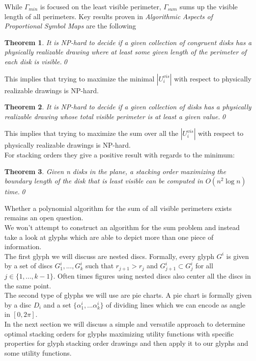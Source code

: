 \documentclass[a4paper,11pt]{article}
\newtheorem{theorem}{Theorem}
\begin{document}
While $\Gamma_{min}$ is focused on the least visible perimeter, $\Gamma_{sum}$ sums up the visible length of all perimeters. Key results proven in \textit{Algorithmic Aspects of Proportional Symbol Maps} are the following
\begin{theorem}
  It is NP-hard to decide if a given collection of congruent disks has a
  physically realizable drawing where at least some given length of the perimeter of
  each disk is visible.\qed
\end{theorem}
This implies that trying to maximize the minimal $|U_i^{vis}|$ with respect to physically realizable drawings is NP-hard.
\begin{theorem}
  It is NP-hard to decide if a given collection of disks has a physically
  realizable drawing whose total visible perimeter is at least a given value.\qed
\end{theorem}
This implies that trying to maximize the sum over all the $|U_i^{vis}|$ with respect to physically realizable drawings is NP-hard.\\
For stacking orders they give a positive result with regards to the minimum:
\begin{theorem}
  Given n disks in the plane, a stacking order maximizing the boundary
  length of the disk that is least visible can be computed in $O(n^2 \log n)$ time.\qed
\end{theorem}
Whether a polynomial algorithm for the sum of all visible perimeters exists remains an open question.\\

We won't attempt to construct an algorithm for the sum problem and instead take a look at glyphs which are able to depict more than one piece of information.\\
The first glyph we will discuss are nested discs. Formally, every glyph $G^i$ is given by a set of discs $G^i_1,...,G^i_k$ such that $r_{j+1}>r_j$ and $G^i_{j+1}\subset G^i_j$ for all $j\in \{1,...,k-1 \}$. Often times figures using nested discs also center all the discs in the same point.\\
The second type of glyphs we will use are pie charts. A pie chart is formally given by a disc $D_i$ and a set $\{\alpha_1^i,...\alpha_k^i\}$ of dividing lines which we can encode as angle in $[0,2\pi ]$.\\

In the next section we will discuss a simple and versatile approach to determine optimal stacking orders for glyphs maximizing utility functions with specific properties for glyph stacking order drawings and then apply it to our glyphs and some utility functions.
\end{document}
